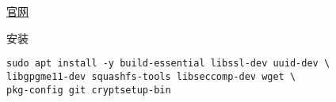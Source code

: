 
\begin{issues}
\issueDraft
\end{issues}

\href{https://sylabs.io/}{官网}

安装
\begin{lstlisting}[language=none]
sudo apt install -y build-essential libssl-dev uuid-dev \
libgpgme11-dev squashfs-tools libseccomp-dev wget \
pkg-config git cryptsetup-bin
\end{lstlisting}
